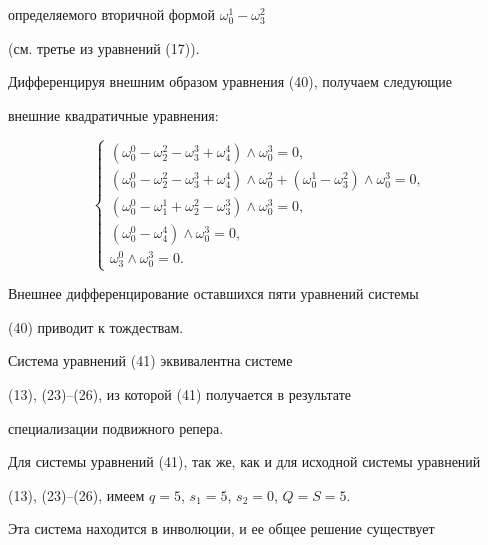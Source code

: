 определяемого вторичной формой $\omega_0^1 -\omega_3^2$


(см. третье из уравнений (17)).





Дифференцируя внешним образом уравнения  (40), получаем следующие


внешние квадратичные уравнения:


\begin{equation}\label{eq:49}


\left\{


\begin{array}{l}


(\omega_0^0 - \omega_2^2 - \omega_3^3 +


\omega_4^4) \wedge \omega_0^3 = 0, \\[2mm]


(\omega_0^0 - \omega_2^2 - \omega_3^3 + \omega_4^4) \wedge\omega_0^2


+ (\omega_0^1 - \omega_3^2)  \wedge \omega_0^3 = 0, \\[2mm]


(\omega_0^0 - \omega_1^1 + \omega_2^2


- \omega_3^3) \wedge \omega_0^3 = 0,\\[2mm]


(\omega_0^0 - \omega_4^4) \wedge \omega_0^3 = 0, \\[2mm]


\omega_3^0 \wedge \omega_0^3 = 0.


\end{array}


\right.


\end{equation}


Внешнее дифференцирование оставшихся пяти уравнений системы


(40) приводит к тождествам.





Система уравнений (41) эквивалентна системе 


(13), (23)--(26), из которой (41) получается в результате


специализации подвижного репера.


Для системы уравнений  (41), так же, как и для исходной системы уравнений


(13), (23)--(26), имеем $q = 5$, $s_1 = 5$, $s_2 = 0$, $Q = S = 5$.


Эта система находится в инволюции, и ее общее решение существует


